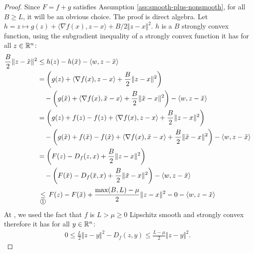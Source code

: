 \documentclass[12pt]{article}
\begin{document}
        \begin{proof}
            Since $F = f + g$ satisfies Assumption \ref{ass:smooth-plus-nonsmooth}, for all $B \ge L$, it will be an obvious choice. 
            The proof is direct algebra. 
            Let $h = z \mapsto g(z) + \langle \nabla f(x), z - x\rangle + B/2\Vert z - x\Vert^2$. 
            $h$ is a $B$ strongly convex function, using the subgradient inequality of a strongly convex function it has for all $z \in \mathbb R^n$: 
            \begin{align*}
                \frac{B}{2}\Vert z - \tilde x\Vert^2
                &\le h(z) - h(\tilde x) - \langle w, z - \tilde x\rangle
                \\
                &= 
                \left(
                    g(z) + \langle \nabla f(x), z - x\rangle + \frac{B}{2}\Vert z - x\Vert^2
                \right)
                \\ &\quad 
                    - 
                    \left(
                        g(\tilde x) + \langle \nabla f(x), \tilde x - x\rangle + \frac{B}{2}\Vert \tilde x - x\Vert^2
                    \right)
                    - \langle w, z - \tilde x\rangle
                \\
                &= \left(
                    g(z) + f(z) - f(z) + \langle \nabla f(x), z - x\rangle + \frac{B}{2}\Vert z - x\Vert^2
                \right)
                \\ &\quad 
                    - 
                    \left(
                        g(\tilde x) + f(\tilde x) - f(\tilde x) 
                        + \langle \nabla f(x), \tilde x - x\rangle + \frac{B}{2}\Vert \tilde x - x\Vert^2
                    \right)
                    - \langle w, z - \tilde x\rangle
                \\
                &= \left(
                    F(z) - D_f(z, x) + \frac{B}{2}\Vert z - x\Vert^2
                \right)
                \\ &\quad 
                    - 
                    \left(
                        F(\tilde x) - D_f(\tilde x, x) + \frac{B}{2}\Vert \tilde x - x\Vert^2
                    \right)
                    - \langle w, z - \tilde x\rangle
                \\
                &\underset{\text{\circled{1}}}{\le} F(z) - F(\tilde x) + \frac{\max(B, L) - \mu}{2}\Vert z - x\Vert^2 - 0 - \langle w, z - \tilde x \rangle
            \end{align*}
            At , we used the fact that $f$ is $L > \mu \ge 0$ Lipschitz smooth and strongly convex therefore it has for all $y \in \mathbb R^n$: 
            \begin{align*}
                0 
                \le \frac{L}{2}\Vert z - y\Vert^2  - D_f(z, y)
                \le \frac{L - \mu}{2}\Vert z - y\Vert^2. 
            \end{align*}
        \end{proof}
\end{document}
